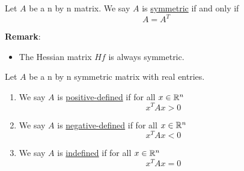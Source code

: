 \begin{definition}
    Let $A$ be a n by n matrix. We say $A$ is \underline{symmetric} if and only if $$A=A^T$$
\end{definition}
\noindent \textbf{Remark}:
\begin{itemize}
    \item The Hessian matrix $Hf$ is always symmetric.
\end{itemize}

\begin{definition}
    Let $A$ be a n by n symmetric matrix with real entries.
    \begin{enumerate}
        \item We say $A$ is \underline{positive-defined} if for all $x\in \mathbb{R}^n$
        $$x^TAx>0$$
        \item We say $A$ is \underline{negative-defined} if for all $x\in \mathbb{R}^n$
        $$x^TAx<0$$
        \item We say $A$ is \underline{indefined} if for all $x\in \mathbb{R}^n$
        $$x^TAx=0$$
    \end{enumerate}
\end{definition}

